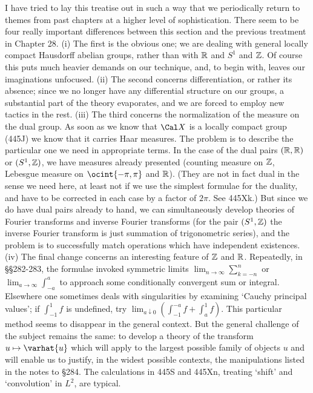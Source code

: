 {I have tried to lay this treatise out in such a way that we periodically
return to themes from past chapters at a higher level of sophistication.
There seem to be four really important differences between this section
and the previous treatment in Chapter 28.   (i) The first is the obvious
one;  we are dealing with general locally compact Hausdorff abelian
groups, rather than with $\Bbb R$ and $S^1$ and $\Bbb Z$.   Of course
this puts much heavier demands on our technique, and, to begin with,
leaves our imaginations unfocused.   (ii) The second concerns
differentiation, or rather its absence;  since we no longer have any
differential structure on our groups, a substantial part of the theory
evaporates, and we are forced to employ new tactics in the rest.   (iii)
The third concerns the normalization of the measure on the dual group.
As soon as we know that $\Cal X$ is a locally compact group (445J) we
know that it carries Haar measures.   The problem is to describe the
particular one we need in appropriate terms.   In the case of the dual
pairs $(\Bbb R,\Bbb R)$ or $(S^1,\Bbb Z)$, we have measures already
presented (counting measure on $\Bbb Z$, Lebesgue measure on
$\ocint{-\pi,\pi}$ and $\Bbb R$).   (They are not in fact dual in the
sense we need here, at least not if we use the simplest formulae for the
duality, and have to be corrected in each case by a factor of $2\pi$.
See 445Xk.)   But since we do have dual pairs already to hand, we can
simultaneously develop theories of Fourier transforms and inverse
Fourier transforms (for the pair $(S^1,\Bbb Z)$ the inverse Fourier
transform is just summation of trigonometric series), and the problem is
to successfully match operations which have independent existences.
(iv) The final change concerns an interesting feature of $\Bbb Z$ and
$\Bbb R$.   Repeatedly, in \S\S282-283, the formulae invoked symmetric
limits $\lim_{n\to\infty}\sum_{k=-n}^n$ or $\lim_{a\to\infty}\int_{-a}^a$
to approach some conditionally convergent sum or integral.   Elsewhere
one sometimes deals with singularities by examining `Cauchy principal
values';  if $\int_{-1}^1f$ is undefined, try
$\lim_{a\downarrow 0}(\int_{-1}^{-a}f+\int_a^1f)$.   This particular
method seems to disappear in the general context.   But the general
challenge of the subject remains the same:  to develop a theory of the
transform $u\mapsto\varhat{u}$ which will apply to the largest possible
family of objects $u$ and will enable us to justify, in the widest
possible contexts, the manipulations listed in the notes to \S284.   The
calculations in 445S and 445Xn, treating `shift' and `convolution' in
$L^2$, are typical.

}
